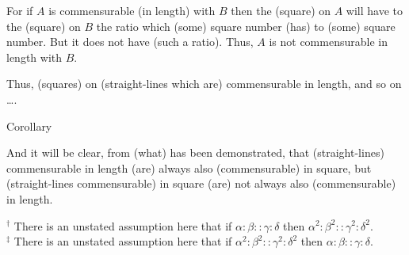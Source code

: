 \begin{Parallel}{}{}
{For if $A$ is commensurable (in length) with $B$ then  the 
(square) on $A$ will have to the (square) on $B$ the ratio which (some) square
number (has) to (some) square number. But it does not have (such a ratio). 
Thus, $A$ is not commensurable in length with $B$.

Thus, (squares) on (straight-lines which are) commensurable in length,
and so on \ldots.\\

\begin{center}
{\large Corollary}
\end{center}\vspace*{-7pt}

And it will be clear, from (what) has been demonstrated, that (straight-lines)
commensurable in length (are) always also (commensurable) in square, 
but (straight-lines commensurable) in square (are) not always also (commensurable)
in length.}
\end{Parallel}
{\footnotesize\noindent$^\dag$ There is an unstated assumption here that if $\alpha:\beta::\gamma:\delta$ then $\alpha^2:\beta^2::\gamma^2:\delta^2$.\\[0.5ex]
$^\ddag$ There is an unstated
assumption here that if $\alpha^2:\beta^2::\gamma^2:\delta^2$ then $\alpha:\beta::\gamma:\delta$.}


